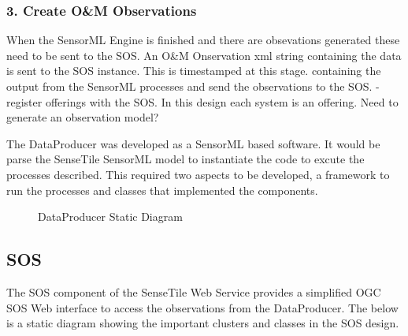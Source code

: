 \documentclass[]{final_report}
\begin{document}
\subsubsection {3. Create O\&M Observations}

When the SensorML Engine is finished
and there are obsevations generated these
need to be sent to the SOS. An O\&M Onservation
xml string containing the data is sent to
the SOS instance. This is timestamped at
this stage.
 containing the output from
the SensorML processes and send the observations
to the SOS.
-register offerings with the SOS. In this design
each system is an offering.
Need to generate an observation model?


The DataProducer was developed as a SensorML based software. It would be parse the SenseTile SensorML model to instantiate the code to excute the processes described. This required two aspects to be developed, a framework to run the processes and classes that implemented the components.

\begin{figure}[h]
\caption{DataProducer Static Diagram}\label{fig:bon_static_diagam_producer.png}
\end{figure}


\newpage
\subsection {SOS}

The SOS component of the SenseTile Web Service provides a simplified OGC SOS Web interface to access the observations from the DataProducer. The below is a static diagram showing the important clusters and classes in the SOS design.
\end{document}
